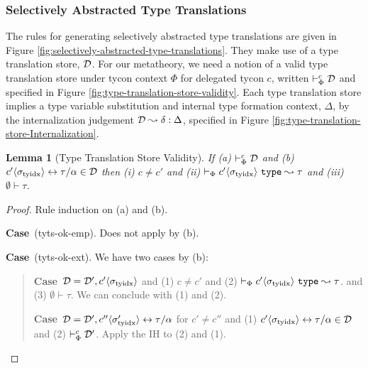 \documentclass[12pt]{article}
\newtheorem{lemma}{Lemma}
\newcommand{\pfcase}[1]{\textbf{Case}~#1. }
\begin{document}
\subsubsection{Selectively Abstracted Type Translations}
The rules for generating selectively abstracted type translations are given in Figure \ref{fig:selectively-abstracted-type-translations}. They make use of a type translation store, $\mathcal{D}$. For our metatheory, we need a notion of a valid type translation store under tycon context $\Phi$ for delegated tycon $c$, written $\vdash_{\Phi}^{c} \mathcal{D}$ and specified in Figure \ref{fig:type-translation-store-validity}. Each type translation store implies a type variable substitution and internal type formation context, $\Delta$, by the internalization judgement $\mathcal{D} \leadsto \delta : \Delta$, specified in Figure \ref{fig:type-translation-store-Internalization}.

\begin{lemma}[Type Translation Store Validity]
\label{lemma:type-translation-store-validitiy}
If (a) $\vdash_{\Phi}^{c} \mathcal{D}$ and (b) ${c'}\langle\sigma_\text{tyidx}\rangle \leftrightarrow \tau/\alpha \in \mathcal{D}$ then (i) $c\neq c'$ and (ii) $\vdash_{\Phi} {c'}\langle\sigma_\text{tyidx}\rangle~\mathtt{type} \leadsto \tau$ and (iii) $\emptyset \vdash \tau$.
\end{lemma}
\begin{proof} Rule induction on (a) and (b).

\pfcase{(tyts-ok-emp)} Does not apply by (b).

\pfcase{(tyts-ok-ext)} We have two cases by (b):
\begin{quote}
    \pfcase{$\mathcal{D}=\mathcal{D}', {c'}\langle\sigma_\text{tyidx}\rangle$ and (1) $c\neq c'$ and (2) $\vdash_{\Phi} {c'}\langle\sigma_\text{tyidx}\rangle~\mathtt{type} \leadsto \tau$} and (3) $\emptyset \vdash \tau$. We can conclude with (1) and (2).

    \pfcase{$\mathcal{D}=\mathcal{D}', {c''}\langle\sigma_\text{tyidx}'\rangle \leftrightarrow \tau/\alpha$ for $c'\neq c''$ and (1) ${c'}\langle\sigma_\text{tyidx}\rangle \leftrightarrow \tau/\alpha \in \mathcal{D}$ and (2) $\vdash_{\Phi}^{c} \mathcal{D}'$} Apply the IH to  (2) and (1).
\end{quote}
\end{proof}
\end{document}
